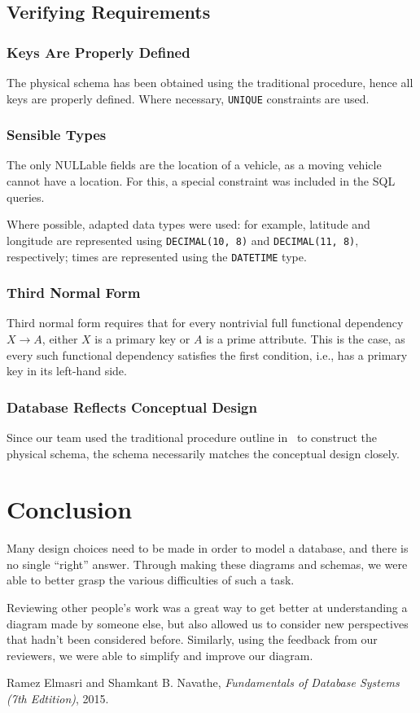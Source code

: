 \documentclass[journal, 9pt]{IEEEtran}
\theoremstyle{definition}
\newcommand{\sql}[1]{\texttt{#1}}
\begin{document}
\subsection{Verifying Requirements}
\subsubsection{Keys Are Properly Defined}
The physical schema has been obtained using the traditional procedure, hence all keys are properly defined.
Where necessary, \sql{UNIQUE} constraints are used.

\subsubsection{Sensible Types}
The only NULLable fields are the location of a vehicle, as a moving vehicle cannot have a location.
For this, a special constraint was included in the SQL queries.

Where possible, adapted data types were used: for example, latitude and longitude are represented using \sql{DECIMAL(10, 8)} and \sql{DECIMAL(11, 8)}, respectively; times are represented using the \textcolor{lgreen}{\texttt{DATETIME}} type.

\subsubsection{Third Normal Form}
Third normal form requires that for every nontrivial full functional dependency \(X \to A\), either \(X\) is a primary key or \(A\) is a prime attribute.
This is the case, as every such functional dependency satisfies the first condition, i.e., has a primary key in its left-hand side.

\subsubsection{Database Reflects Conceptual Design}
Since our team used the traditional procedure outline in~\cite{db} to construct the physical schema, the schema necessarily matches the conceptual design closely.

\section*{Conclusion}
Many design choices need to be made in order to model a database, and there is no single ``right'' answer.
Through making these diagrams and schemas, we were able to better grasp the various difficulties of such a task.

Reviewing other people's work was a great way to get better at understanding a diagram made by someone else, but also allowed us to consider new perspectives that hadn't been considered before.
Similarly, using the feedback from our reviewers, we were able to simplify and improve our diagram.

\begin{thebibliography}{9}
	Ramez Elmasri and Shamkant B. Navathe, \textit{Fundamentals of Database Systems (7th Edtition)}, 2015.
\end{thebibliography}
\end{document}
